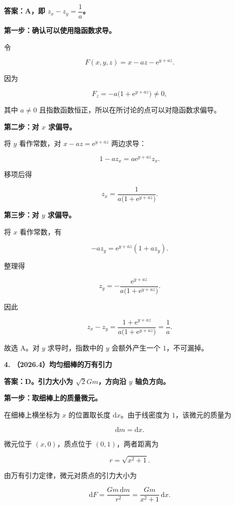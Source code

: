 \documentclass[UTF8,11pt,fontset=windows]{ctexart}
\begin{document}
\textbf{答案：A，即 $z_x-z_y=\dfrac1a$。}

\textbf{第一步：确认可以使用隐函数求导。}

令

$$
F(x,y,z)=x-az-\mathrm{e}^{y+az}.
$$

因为

$$
F_z=-a\bigl(1+\mathrm{e}^{y+az}\bigr)\ne0,
$$

其中 $a\ne0$ 且指数函数恒正，所以在所讨论的点可以对隐函数求偏导。

\textbf{第二步：对 $x$ 求偏导。}

将 $y$ 看作常数，对 $x-az=\mathrm{e}^{y+az}$ 两边求导：

$$
1-az_x=a\mathrm{e}^{y+az}z_x.
$$

移项后得

$$
z_x=\frac{1}{a\bigl(1+\mathrm{e}^{y+az}\bigr)}.
$$

\textbf{第三步：对 $y$ 求偏导。}

将 $x$ 看作常数，有

$$
-az_y=\mathrm{e}^{y+az}(1+az_y).
$$

整理得

$$
z_y=-\frac{\mathrm{e}^{y+az}}{a\bigl(1+\mathrm{e}^{y+az}\bigr)}.
$$

因此

$$
z_x-z_y
=\frac{1+\mathrm{e}^{y+az}}{a\bigl(1+\mathrm{e}^{y+az}\bigr)}
=\frac1a.
$$

故选 A。对 $y$ 求导时，指数中的 $y$ 会额外产生一个 $1$，不可漏掉。

\clearpage

\textbf{4. （2026.4）均匀细棒的万有引力}

\textbf{答案：D。引力大小为 $\sqrt2Gm$，方向沿 $y$ 轴负方向。}

\textbf{第一步：取细棒上的质量微元。}

在细棒上横坐标为 $x$ 的位置取长度 $\mathrm{d}x$。由于线密度为 $1$，该微元的质量为

$$
\mathrm{d}m=\mathrm{d}x.
$$

微元位于 $(x,0)$，质点位于 $(0,1)$，两者距离为

$$
r=\sqrt{x^2+1}.
$$

由万有引力定律，微元对质点的引力大小为

$$
\mathrm{d}F=\frac{Gm\,\mathrm{d}m}{r^2}
=\frac{Gm}{x^2+1}\,\mathrm{d}x.
$$
\end{document}
